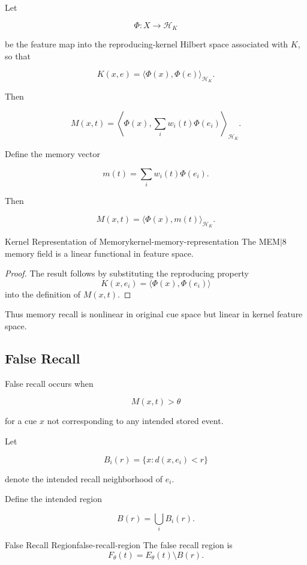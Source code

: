 \documentclass[12pt,twoside,openright]{book}
\begin{document}
Let

\[
\Phi:X\to\mathcal H_K
\]

be the feature map into the reproducing-kernel Hilbert
space associated with \(K\), so that

\[
K(x,e)
=
\langle \Phi(x),\Phi(e)\rangle_{\mathcal H_K}.
\]

Then

\[
M(x,t)
=
\left\langle
\Phi(x),
\sum_i w_i(t)\Phi(e_i)
\right\rangle_{\mathcal H_K}.
\]

Define the memory vector

\[
m(t)
=
\sum_i w_i(t)\Phi(e_i).
\]

Then

\[
M(x,t)
=
\langle\Phi(x),m(t)\rangle_{\mathcal H_K}.
\]

\begin{proposition}{Kernel Representation of Memory}{kernel-memory-representation}
  The MEM\(|\)8 memory field is a linear functional in
  feature space.
\end{proposition}

\begin{proof}
  The result follows by substituting the reproducing
  property
  \[
    K(x,e_i)
=
    \langle\Phi(x),\Phi(e_i)\rangle
  \]
  into the definition of \(M(x,t)\).
\end{proof}

Thus memory recall is nonlinear in original cue space but
linear in kernel feature space.

\subsection{False Recall}

False recall occurs when

\[
M(x,t)>\theta
\]

for a cue \(x\) not corresponding to any intended stored
event.

Let

\[
B_i(r)
=
\{x:d(x,e_i)<r\}
\]

denote the intended recall neighborhood of \(e_i\).

Define the intended region

\[
B(r)
=
\bigcup_i B_i(r).
\]

\begin{definition}{False Recall Region}{false-recall-region}
  The false recall region is
  \[
    F_\theta(t)
=
    E_\theta(t)\setminus B(r).
  \]
\end{definition}
\end{document}
